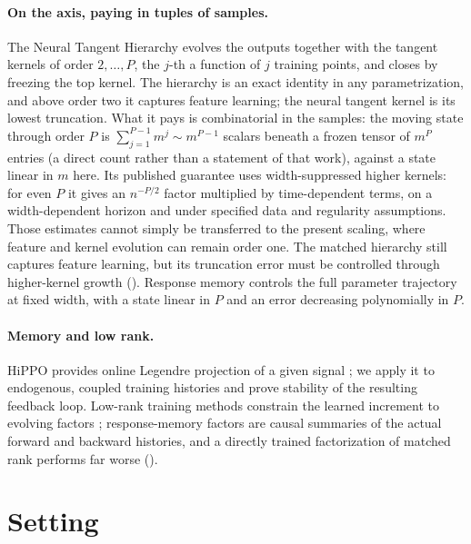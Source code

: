 \documentclass[11pt]{article}
\theoremstyle{definition}
\theoremstyle{remark}
\begin{document}
\paragraph{On the axis, paying in tuples of samples.}
The Neural Tangent Hierarchy \citep{huang2020nth} evolves the outputs together
with the tangent kernels of order $2,\dots,P$, the $j$-th a function of $j$
training points, and closes by freezing the top kernel.  The hierarchy is an
exact identity in any parametrization, and above order two it captures feature
learning; the neural tangent kernel is its lowest truncation.  What it pays is
combinatorial in the samples: the moving state through order $P$ is
$\sum_{j=1}^{P-1}m^j\sim m^{P-1}$ scalars beneath a frozen tensor of $m^P$
entries (a direct count rather than a statement of that work), against a state
linear in $m$ here.  Its published guarantee uses width-suppressed higher
kernels: for even $P$ it gives an $n^{-P/2}$ factor multiplied by
time-dependent terms, on
a width-dependent horizon and under specified data and regularity assumptions.
Those estimates cannot simply be transferred to the present scaling, where
feature and kernel evolution can remain order one.  The matched hierarchy
still captures feature learning, but its truncation error must be controlled
through higher-kernel growth ().
Response memory controls the full parameter trajectory at fixed width, with a
state linear in $P$ and an error decreasing polynomially in $P$.

\paragraph{Memory and low rank.}
HiPPO provides online Legendre projection of a given signal \citep{gu2020hippo};
we apply it to endogenous, coupled training histories and prove stability of the
resulting feedback loop.  Low-rank training methods constrain the learned
increment to evolving factors \citep{zhao2023inrank}; response-memory factors are
causal summaries of the actual forward and backward histories, and a directly
trained factorization of matched rank performs far worse
().

\section{Setting}
\label{sec:setting}
\end{document}
